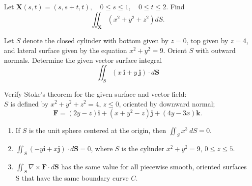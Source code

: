 \documentclass[12pt,letterpaper]{hmcpset}
\newcommand{\vb}{\mathbf}
\begin{document}
\begin{problem}[Colley 7.2.1]
  Let $\vb X(s,t) = (s, s + t, t),\quad 0\leq s \leq 1, \quad 0 \leq t \leq 2$.
  Find
  \[ \iint_{\vb X} \left( x^2 + y^2 + z^2 \right)dS.\]
\end{problem}
\clearpage

\begin{problem}[Colley 7.2.14]
  Let $S$ denote the closed cylinder with bottom given by $z = 0$, top given by $z = 4$, and lateral surface given by the equation $x^2 + y^2 = 9$.
  Orient $S$ with outward normals.
  Determine the given vector surface integral
  \[ \iint_S \left( x~\vb i + y~\vb j\right)\cdot d\vb S \]
\end{problem}
\clearpage

\begin{problem}[Colley 7.3.4]
  Verify Stoke's theorem for the given surface and  vector field: \\
  $S$ is defined by $x^2 + y^2 + z^2 = 4$, $z \leq 0$, oriented by downward normal;
  \[ \vb F = (2y - z)\vb i + (x + y^2 - z)\vb j + (4y -3x)\vb k. \]
\end{problem}
\clearpage

\begin{problem}[Colley 7 T/F]
  \begin{enumerate}
    \addtocounter{enumi}{5}
  \item If $S$ is the unit sphere centered at the origin, then $\iint_S x^3~dS = 0$.
    \addtocounter{enumi}{3}
  \item $\iint_S (-y\vb i + x\vb j)\cdot d\vb S = 0$, where $S$ is the cylinder $x^2 + y^2 = 9$, $0 \leq z \leq 5$.
    \addtocounter{enumi}{7}
  \item $\iint_S \nabla \times \vb F \cdot d\vb S$ has the same value for all piecewise smooth, oriented surfaces S that have the same boundary curve $C$.
  \end{enumerate}
\end{problem}
\end{document}
